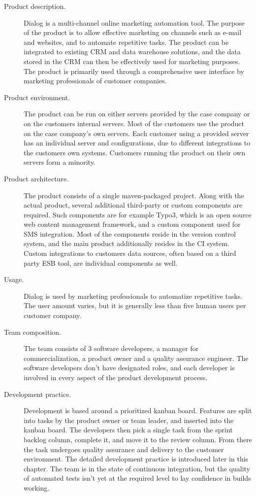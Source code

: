 \documentclass[english, grading]{tktltiki2}
\theoremstyle{definition}
\theoremstyle{remark}
\begin{document}
\begin{description}
  \item[Product description.] Dialog is a multi-channel online marketing automation tool. The purpose of the product is to allow effective marketing on channels such as e-mail and websites, and to automate repetitive tasks. The product can be integrated to existing CRM and data warehouse solutions, and the data stored in the CRM can then be effectively used for marketing purposes. The product is primarily used through a comprehensive user interface by marketing professionals of customer companies. 
  \item[Product environment.] The product can be run on either servers provided by the case company or on the customers internal servers. Most of the customers use the product on the case company's own servers. Each customer using a provided server has an individual server and configurations, due to different integrations to the customers own systems. Customers running the product on their own servers form a minority.
  \item[Product architecture.] The product consists of a single maven-packaged project. Along with the actual product, several additional third-party or custom components are required. Such components are for example Typo3, which is an open source web content management framework, and a custom component used for SMS integration. Most of the components reside in the version control system, and the main product additionally resides in the CI system. Custom integrations to customers data sources, often based on a third party ESB tool, are individual components as well.
  \item[Usage.] Dialog is used by marketing professionals to automatize repetitive tasks. The user amount varies, but it is generally less than five human users per customer company.
  \item[Team composition.] The team consists of 3 software developers, a manager for commercialization, a product owner and a quality assurance engineer. The software developers don't have designated roles, and each developer is involved in every aspect of the product development process.
  \item[Development practice.] Development is based around a prioritized kanban board. Features are split into tasks by the product owner or team leader, and inserted into the kanban board. The developers then pick a single task from the sprint backlog column, complete it, and move it to the review column. From there the task undergoes quality assurance and delivery to the customer environment. The detailed development practice is introduced later in this chapter. The team is in the state of continuous integration, but the quality of automated tests isn't yet at the required level to lay confidence in builds working. 

\end{description}
\end{document}
